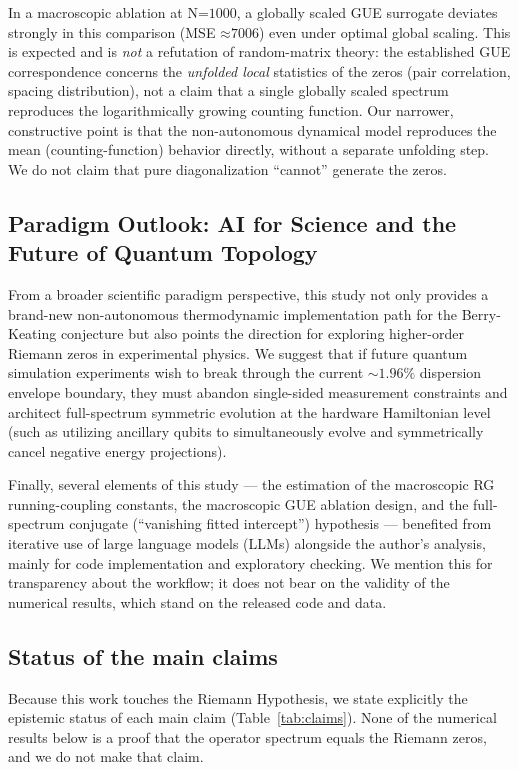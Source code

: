 In a macroscopic ablation at \(\text{N}\text{=1000}\), a globally scaled
GUE surrogate deviates strongly in this comparison (MSE
\(\text{≈7006}\)) even under optimal global scaling. This is expected
and is \emph{not} a refutation of random-matrix theory: the established
GUE correspondence concerns the \emph{unfolded local} statistics of the
zeros (pair correlation, spacing distribution), not a claim that a single
globally scaled spectrum reproduces the logarithmically growing counting
function. Our narrower, constructive point is that the non-autonomous
dynamical model reproduces the mean (counting-function) behavior
directly, without a separate unfolding step. We do not claim that pure
diagonalization ``cannot'' generate the zeros.

\subsection*{Paradigm Outlook: AI for Science and the Future of Quantum Topology}

From a broader scientific paradigm perspective, this study not only
provides a brand-new non-autonomous thermodynamic implementation path
for the Berry-Keating conjecture but also points the direction for
exploring higher-order Riemann zeros in experimental physics. We suggest
that if future quantum simulation experiments wish to break through the
current \(\text{∼1.96\%}\) dispersion envelope boundary, they must
abandon single-sided measurement constraints and architect full-spectrum
symmetric evolution at the hardware Hamiltonian level (such as utilizing
ancillary qubits to simultaneously evolve and symmetrically cancel
negative energy projections).

Finally, several elements of this study --- the estimation of the
macroscopic RG running-coupling constants, the macroscopic GUE ablation
design, and the full-spectrum conjugate (``vanishing fitted intercept'')
hypothesis --- benefited from iterative use of large language models
(LLMs) alongside the author's analysis, mainly for code implementation
and exploratory checking. We mention this for transparency about the
workflow; it does not bear on the validity of the numerical results,
which stand on the released code and data.

\subsection*{Status of the main claims}

Because this work touches the Riemann Hypothesis, we state explicitly the
epistemic status of each main claim (Table~\ref{tab:claims}). None of the
numerical results below is a proof that the operator spectrum equals the
Riemann zeros, and we do not make that claim.

